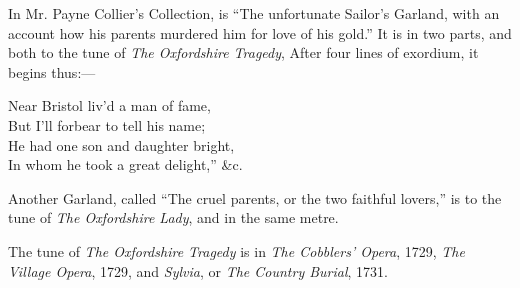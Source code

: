 In Mr. Payne Collier’s Collection, is “The unfortunate Sailor’s Garland, with
an account how his parents murdered him for love of his gold.” It is in two
parts, and both to the tune of \textit{The Oxfordshire Tragedy}, After four lines of
exordium, it begins thus:—


\settowidth{\versewidth}{“Near Bristol liv’d a man of fame,}
\begin{scverse}Near Bristol liv’d a man of fame,\\
But I’ll forbear to tell his name;\\
He had one son and daughter bright,\\
In whom he took a great delight,” \&c.
\end{scverse}

Another Garland, called “The cruel parents, or the two faithful lovers,” is to
the tune of \textit{The Oxfordshire Lady}, and in the same metre.

The tune of \textit{The Oxfordshire Tragedy} is in \textit{The Cobblers’ Opera}, 1729, \textit{The
Village Opera}, 1729, and \textit{Sylvia}, or \textit{The Country Burial}, 1731.



\vspace{-2\baselineskip}

